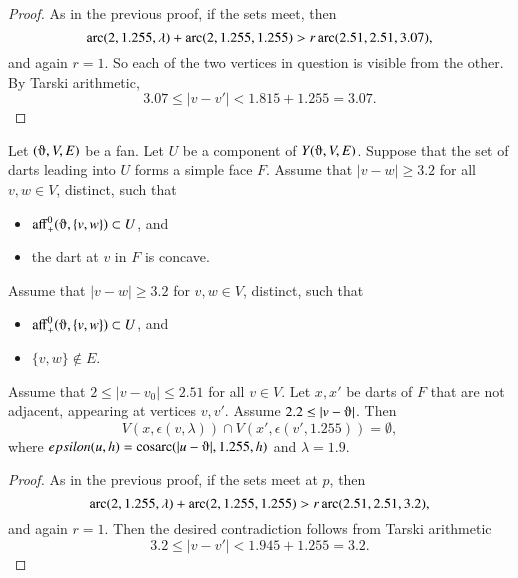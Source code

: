 \begin{proof}
As in the previous proof, if the sets meet, then
    $$\operatorname{arc}(2,1.255,\lambda) +\operatorname{arc}(2,1.255,1.255) > r \operatorname{arc}(2.51,2.51,3.07),$$
and again $r=1$.  So each of the two vertices in question is visible
from the other. By Tarski arithmetic, 
$$
3.07 \le |v-v'| < 1.815 + 1.255 = 3.07.
$$
\end{proof}

\begin{lemma}
Let $(\orgn,V,E)$ be a fan.  Let $U$ be a component of $Y(\orgn,V,E)$.
Suppose that the set of darts leading into $U$ forms a simple face $F$.
Assume that $|v-w|\ge 3.2$ for all $v,w\in V$, distinct, such that
  \begin{itemize}
   \item $\op{aff}_+^0(\orgn,\{v,w\})\subset U$, and
   \item the dart at $v$ in $F$ is concave.
  \end{itemize}
Assume that $|v-w|\ge 3.2$ for $v,w\in V$, distinct, such that
  \begin{itemize}
   \item $\op{aff}_+^0(\orgn,\{v,w\})\subset U$, and
   \item $\{v,w\}\not\in E$.  %
  \end{itemize}
Assume that $2\le |v-v_0|\le 2.51$ for all $v\in V$.
Let $x,x'$ be darts of $F$ that are not adjacent, appearing at vertices
$v,v'$.  Assume $2.2\le |v-\orgn|$.  Then
$$
V(x,\epsilon(v,\lambda))\cap V(x',\epsilon(v',1.255)) = \emptyset,
$$
where $\epsilon(u,h) = \cosarc(|u-\orgn|,1.255,h)$ and $\lambda=1.9$.
\end{lemma}

\begin{proof}
As in the previous proof, if the sets meet at $p$, then
    $$\operatorname{arc}(2,1.255,\lambda) +\operatorname{arc}(2,1.255,1.255) > r \operatorname{arc}(2.51,2.51,3.2),$$
and again $r=1$.  Then the desired contradiction 
follows from Tarski arithmetic
    $$3.2\le |v-v'|<  1.945 + 1.255 = 3.2.$$
\end{proof}





